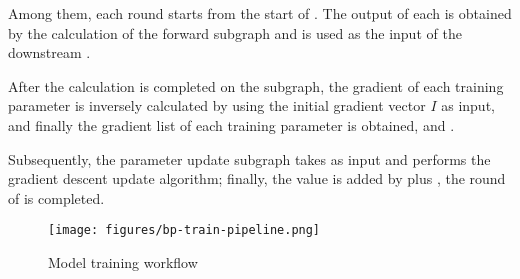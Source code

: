 \begin{content}
Among them, each round  starts from the start of . The output of each  is obtained by the calculation of the forward subgraph and is used as the input of the downstream .

After the calculation is completed on the subgraph, the gradient of each training parameter is inversely calculated by using the initial gradient vector $I$ as input, and finally the gradient list of each training parameter is obtained, and .

Subsequently, the parameter update subgraph takes  as input and performs the gradient descent update algorithm; finally, the  value is added by  plus , the round of  is completed.

\begin{figure}[!h]
\centering
\texttt{[image: figures/bp-train-pipeline.png]}
\caption{Model training workflow}
 \label{fig:bp-train-pipeline}
\end{figure}

\end{content}
